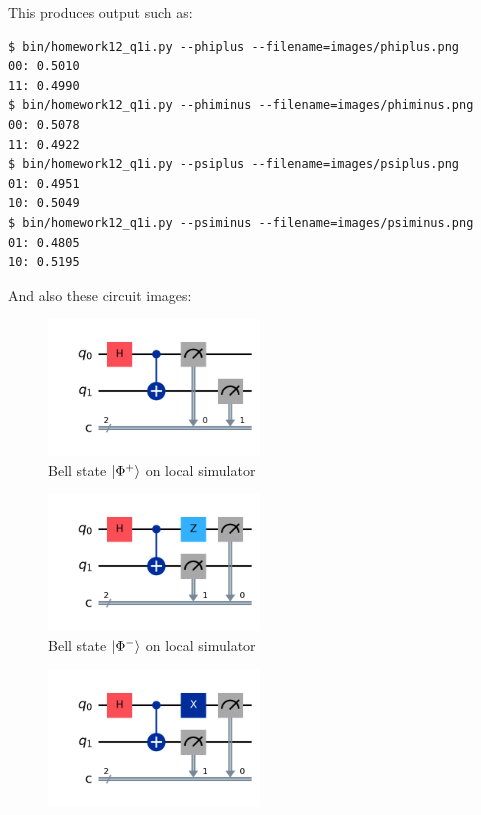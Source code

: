 \documentclass[12pt]{extarticle}
\begin{document}
\begin{enumerate}[(i)]
This produces output such as:
\begin{footnotesize}
\begin{lstlisting}
$ bin/homework12_q1i.py --phiplus --filename=images/phiplus.png
00: 0.5010
11: 0.4990
$ bin/homework12_q1i.py --phiminus --filename=images/phiminus.png
00: 0.5078
11: 0.4922
$ bin/homework12_q1i.py --psiplus --filename=images/psiplus.png
01: 0.4951
10: 0.5049
$ bin/homework12_q1i.py --psiminus --filename=images/psiminus.png
01: 0.4805
10: 0.5195
\end{lstlisting}
\end{footnotesize}

And also these circuit images:
\begin{figure}[H]
\centering
\includegraphics[width=0.50\textwidth]{images/phiplus.png}
\caption{Bell state $\ket{\Phi^{+}}$ on local simulator}
\end{figure}
\begin{figure}[H]
\centering
\includegraphics[width=0.50\textwidth]{images/phiminus.png}
\caption{Bell state $\ket{\Phi^{-}}$ on local simulator}
\end{figure}
\begin{figure}[H]
\centering
\includegraphics[width=0.50\textwidth]{images/psiplus.png}

\end{figure}
\end{enumerate}
\end{document}
